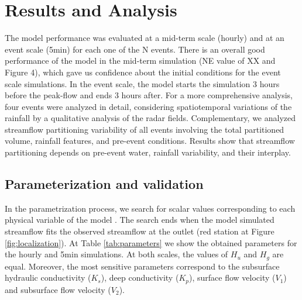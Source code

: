 \documentclass[preprint,12pt]{elsarticle}
\begin{document}
\section{Results and Analysis}
\label{results}

The model performance was evaluated at a mid-term scale (hourly) and at an event scale (5min) for each one of the N events.  There is an overall good performance of the model in the mid-term simulation (NE value of XX and Figure 4), which gave us confidence about the initial conditions for the event scale simulations. In the event scale, the model starts the simulation 3 hours before the peak-flow and ends 3 hours after.  For a more comprehensive analysis, four events were analyzed in detail, considering spatiotemporal variations of the rainfall by a qualitative analysis of the radar fields.  Complementary, we analyzed streamflow partitioning variability of all events involving the total partitioned volume, rainfall features, and pre-event conditions.  Results show that streamflow partitioning depends on pre-event water, rainfall variability, and their interplay.\\      

\subsection{Parameterization and validation}

In the parametrization process, we search for scalar values corresponding to each physical variable of the model \citep{Frances2007}.  The search ends when the model simulated streamflow fits the observed streamflow at the outlet (red station at Figure \ref{fig:localization}).  At Table \ref{tab:parameters} we show the obtained parameters for the hourly and 5min simulations.  At both scales, the values of $H_u$ and $H_g$ are equal. Moreover, the most sensitive parameters correspond to the subsurface hydraulic conductivity ($K_s$), deep conductivity ($K_p$), surface flow velocity ($V_1$) and subsurface flow velocity ($V_2$).\\
\end{document}
